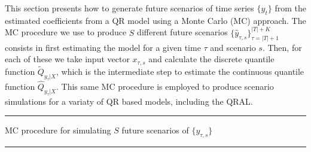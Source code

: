 This section presents how to generate future scenarios of time series $\{y_t\}$ from the estimated coefficients from a QR model using a Monte Carlo (MC) approach. 
The MC procedure  we use to produce $S$ different future scenarios $\{ \hat{y}_{\tau,s} \}_{\tau=|T|+1}^{|T|+K}$ consists in first estimating the model for a given time $\tau$ and scenario $s$. Then, for each of these we take input vector $x_{\tau,s}$ and calculate the discrete quantile function $\tilde{Q}_{y_{\tau}|X}$, which is the intermediate step to estimate the continuous quantile function $\hat{Q}_{y_{\tau}|X}$. 
This same MC procedure is employed to produce scenario simulations for a variaty of QR based models, including the QRAL.

\noindent\rule{\columnwidth}{1pt}

MC procedure for simulating $S$ future scenarios of $\{y_{\tau,s}\}$

\noindent\rule{\columnwidth}{1pt}

